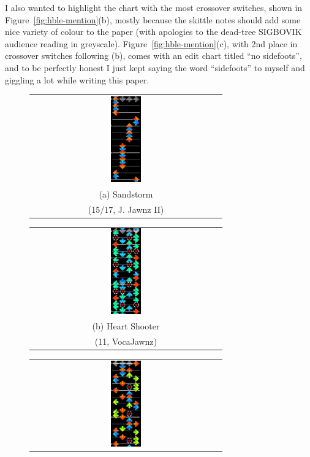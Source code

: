 \documentclass[10pt]{sigplanconf}
\begin{document}
I also wanted to highlight the chart with the most crossover switches,
shown in Figure~\ref{fig:hble-mention}(b),
mostly because the skittle notes should add some nice variety of colour to the paper
(with apologies to the dead-tree SIGBOVIK audience reading in greyscale).
Figure~\ref{fig:hble-mention}(c), with 2nd place in crossover switches following (b),
comes with an edit chart titled ``no sidefoots'',
and to be perfectly honest I just kept saying the word ``sidefoots'' to myself and giggling a lot while writing this paper.

\begin{figure}[t]
	\begin{center}
	\begin{tabular}{c}
		\includegraphics[width=0.16\textwidth]{sandstorm-jacks.png}
		\\
		(a) Sandstorm \\
		(15/17, J. Jawnz II)
	\end{tabular}
	\begin{tabular}{c}
		\includegraphics[width=0.16\textwidth]{heart-shooter-xover-fs.png}
		\\
		(b) Heart Shooter \\
		(11, VocaJawnz)
	\end{tabular}
	\begin{tabular}{c}
		\includegraphics[width=0.16\textwidth]{slow-train-sidefoots.png}

\end{tabular}
\end{center}
\end{figure}
\end{document}
